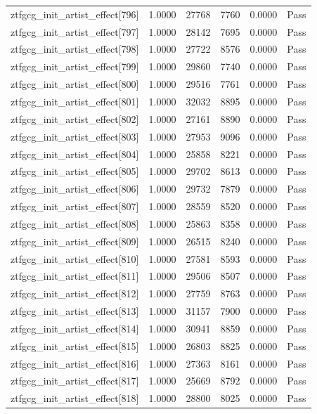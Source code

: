 \begin{table}[htbp]
\begin{tabular}{llrrll}
ztfgcg\_init\_artist\_effect[796] & 1.0000 & 27768 & 7760 & 0.0000 & Pass \\
ztfgcg\_init\_artist\_effect[797] & 1.0000 & 28142 & 7695 & 0.0000 & Pass \\
ztfgcg\_init\_artist\_effect[798] & 1.0000 & 27722 & 8576 & 0.0000 & Pass \\
ztfgcg\_init\_artist\_effect[799] & 1.0000 & 29860 & 7740 & 0.0000 & Pass \\
ztfgcg\_init\_artist\_effect[800] & 1.0000 & 29516 & 7761 & 0.0000 & Pass \\
ztfgcg\_init\_artist\_effect[801] & 1.0000 & 32032 & 8895 & 0.0000 & Pass \\
ztfgcg\_init\_artist\_effect[802] & 1.0000 & 27161 & 8890 & 0.0000 & Pass \\
ztfgcg\_init\_artist\_effect[803] & 1.0000 & 27953 & 9096 & 0.0000 & Pass \\
ztfgcg\_init\_artist\_effect[804] & 1.0000 & 25858 & 8221 & 0.0000 & Pass \\
ztfgcg\_init\_artist\_effect[805] & 1.0000 & 29702 & 8613 & 0.0000 & Pass \\
ztfgcg\_init\_artist\_effect[806] & 1.0000 & 29732 & 7879 & 0.0000 & Pass \\
ztfgcg\_init\_artist\_effect[807] & 1.0000 & 28559 & 8520 & 0.0000 & Pass \\
ztfgcg\_init\_artist\_effect[808] & 1.0000 & 25863 & 8358 & 0.0000 & Pass \\
ztfgcg\_init\_artist\_effect[809] & 1.0000 & 26515 & 8240 & 0.0000 & Pass \\
ztfgcg\_init\_artist\_effect[810] & 1.0000 & 27581 & 8593 & 0.0000 & Pass \\
ztfgcg\_init\_artist\_effect[811] & 1.0000 & 29506 & 8507 & 0.0000 & Pass \\
ztfgcg\_init\_artist\_effect[812] & 1.0000 & 27759 & 8763 & 0.0000 & Pass \\
ztfgcg\_init\_artist\_effect[813] & 1.0000 & 31157 & 7900 & 0.0000 & Pass \\
ztfgcg\_init\_artist\_effect[814] & 1.0000 & 30941 & 8859 & 0.0000 & Pass \\
ztfgcg\_init\_artist\_effect[815] & 1.0000 & 26803 & 8825 & 0.0000 & Pass \\
ztfgcg\_init\_artist\_effect[816] & 1.0000 & 27363 & 8161 & 0.0000 & Pass \\
ztfgcg\_init\_artist\_effect[817] & 1.0000 & 25669 & 8792 & 0.0000 & Pass \\
ztfgcg\_init\_artist\_effect[818] & 1.0000 & 28800 & 8025 & 0.0000 & Pass \\

\end{tabular}
\end{table}
